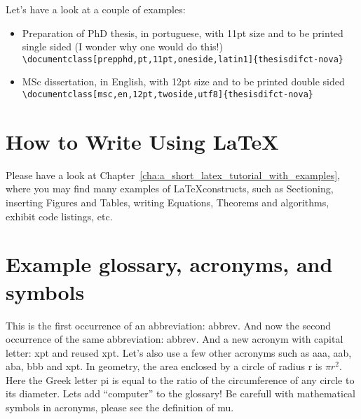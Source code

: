 Let's have a look at a couple of examples:

\begin{itemize}
  \item Preparation of PhD thesis, in portuguese, with 11pt size and to be printed single sided (I wonder why one would do this!)\\
        \verb!\documentclass[prepphd,pt,11pt,oneside,latin1]{thesisdifct-nova}!
  \item MSc dissertation, in English, with 12pt size and to be printed double sided\\
        \verb!\documentclass[msc,en,12pt,twoside,utf8]{thesisdifct-nova}!
\end{itemize}

\section{How to Write Using \LaTeX}
\label{sec:how_to_write_using_latex}

Please have a look at Chapter~\ref{cha:a_short_latex_tutorial_with_examples}, where you may find many examples of \LaTeX constructs, such as Sectioning, inserting Figures and Tables, writing Equations, Theorems and algorithms, exhibit code listings, etc.




\section{Example glossary, acronyms, and symbols}
%
%
This is the first occurrence of an abbreviation: \gls{abbrev}. And now the second occurrence of the same abbreviation: \gls{abbrev}. And a new acronym with capital letter: \Gls{xpt} and reused \gls{xpt}.  Let's also use a few other acronyms such as \gls{aaa}, \gls{aab}, \gls{aba}, \gls{bbb} and \gls{xpt}.
In geometry, the area enclosed by a circle of radius \gls{r} is $\pi r^2$. Here the Greek letter \gls{pi} is equal to the ratio of the circumference of any circle to its diameter.
Lets add ``\gls{computer}'' to the glossary! Be carefull with mathematical symbols in acronyms, please see the definition of \gls{mu}.
%



